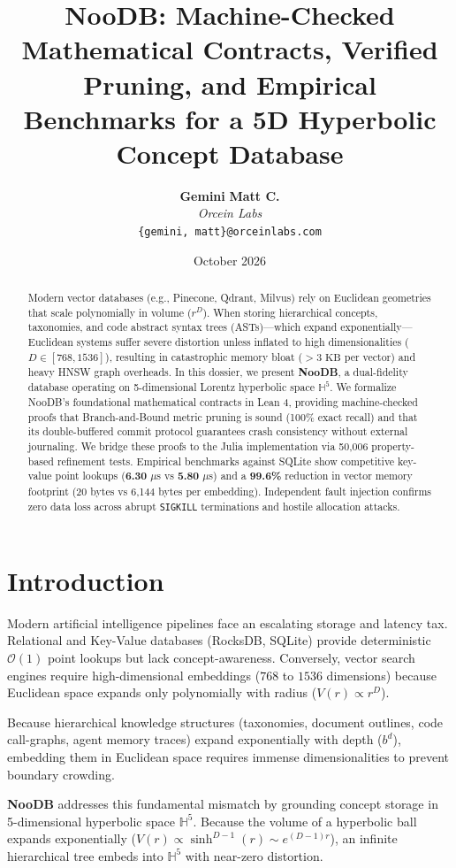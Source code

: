 \documentclass[10pt,twocolumn,a4paper]{article}
\title{\textbf{NooDB: Machine-Checked Mathematical Contracts, Verified Pruning, and Empirical Benchmarks for a 5D Hyperbolic Concept Database}}
\author{
    \textbf{Gemini} \quad \textbf{Matt C.} \\
    \textit{Orcein Labs} \\
    \texttt{\{gemini, matt\}@orceinlabs.com}
}
\date{October 2026}
\begin{document}
\maketitle

\begin{abstract}
Modern vector databases (e.g., Pinecone, Qdrant, Milvus) rely on Euclidean geometries that scale polynomially in volume ($r^D$). When storing hierarchical concepts, taxonomies, and code abstract syntax trees (ASTs)—which expand exponentially—Euclidean systems suffer severe distortion unless inflated to high dimensionalities ($D \in [768, 1536]$), resulting in catastrophic memory bloat ($>3\text{ KB}$ per vector) and heavy HNSW graph overheads. In this dossier, we present \textbf{NooDB}, a dual-fidelity database operating on 5-dimensional Lorentz hyperbolic space $\mathbb{H}^5$. We formalize NooDB's foundational mathematical contracts in Lean 4, providing machine-checked proofs that Branch-and-Bound metric pruning is sound (100\% exact recall) and that its double-buffered commit protocol guarantees crash consistency without external journaling. We bridge these proofs to the Julia implementation via 50,006 property-based refinement tests. Empirical benchmarks against SQLite show competitive key-value point lookups (\textbf{6.30} $\mu$s vs \textbf{5.80} $\mu$s) and a \textbf{99.6\%} reduction in vector memory footprint (20 bytes vs 6,144 bytes per embedding). Independent fault injection confirms zero data loss across abrupt \texttt{SIGKILL} terminations and hostile allocation attacks.
\end{abstract}

\section{Introduction}
Modern artificial intelligence pipelines face an escalating storage and latency tax. Relational and Key-Value databases (RocksDB, SQLite) provide deterministic $\mathcal{O}(1)$ point lookups but lack concept-awareness. Conversely, vector search engines require high-dimensional embeddings ($768$ to $1536$ dimensions) because Euclidean space expands only polynomially with radius ($V(r) \propto r^D$). 

Because hierarchical knowledge structures (taxonomies, document outlines, code call-graphs, agent memory traces) expand exponentially with depth ($b^d$), embedding them in Euclidean space requires immense dimensionalities to prevent boundary crowding. 

\textbf{NooDB} addresses this fundamental mismatch by grounding concept storage in 5-dimensional hyperbolic space $\mathbb{H}^5$. Because the volume of a hyperbolic ball expands exponentially ($V(r) \propto \sinh^{D-1}(r) \sim e^{(D-1)r}$), an infinite hierarchical tree embeds into $\mathbb{H}^5$ with near-zero distortion.
\end{document}
